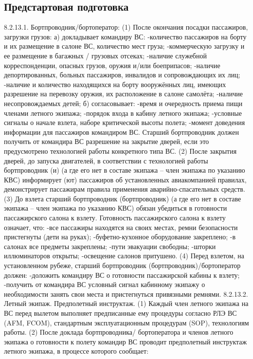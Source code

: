 \subsection{Предстартовая подготовка}
8.2.13.1. Бортпроводник/бортоператор:
(1) После окончания посадки пассажиров, загрузки грузов: 
а)	докладывает командиру ВС: 
-количество пассажиров на борту и их размещение в салоне ВС, количество мест груза;
-коммерческую загрузку и ее размещение в багажных / грузовых отсеках; 
-наличие служебной корреспонденции, опасных грузов, оружия и/или боеприпасов; 
-наличие депортированных, больных пассажиров, инвалидов и сопровождающих их лиц; 
-наличие и количество находящихся на борту вооружённых лиц, имеющих разрешение на перевозку оружия, их расположение в салоне самолёта; 
-наличие несопровождаемых детей;
б)	согласовывает:
-время и очередность приема пищи членами летного экипажа;
-порядок входа в кабину летного экипажа;
-условные сигналы о начале взлета, наборе критической высоты полета;
-момент доведения информации для пассажиров командиром ВС.
Старший бортпроводник должен получить от командира ВС разрешение на закрытие дверей, если это предусмотрено технологией работы конкретного типа ВС.
(2) После закрытия дверей, до запуска двигателей, в соответствии с технологией работы бортпроводник (и) (а где его нет в составе экипажа – член экипажа по указанию КВС) информирует (ют) пассажиров об установленных авиакомпанией правилах, демонстрирует пассажирам правила применения аварийно-спасательных средств. 
(3) До взлета старший бортпроводник (бортпроводник) (а где его нет в составе экипажа – член экипажа по указанию КВС) обязан убедиться в готовности пассажирского салона к взлету. 
Готовность пассажирского салона к взлету означает, что:
-все пассажиры находятся на своих местах, ремни безопасности пристегнуты (дети на руках);
-буфетно-кухонное оборудование закреплено;
-в салонах все предметы закреплены;
-пути эвакуации свободны;
-шторки иллюминаторов открыты;
-освещение салонов притушено.
(4) Перед взлетом, на установленном рубеже, старший бортпроводник (бортпроводник)/бортоператор должен:
-доложить командиру ВС о готовности пассажирской кабины к взлету;
-получить от командира ВС условный сигнал кабинному экипажу о необходимости занять свои места и пристегнуться привязными ремнями.
8.2.13.2. Летный экипаж. Предполетный инструктаж.
(1) Каждый член летного экипажа на ВС перед вылетом выполняет предписанные ему процедуры согласно РЛЭ ВС (AFM, FCOM), стандартным эксплуатационным процедурам (SOP), технологиям работы.
(2) После доклада бортпроводника/ бортоператора и членов летного экипажа о готовности к полету командир ВС проводит предполетный инструктаж летного экипажа, в процессе которого сообщает:

